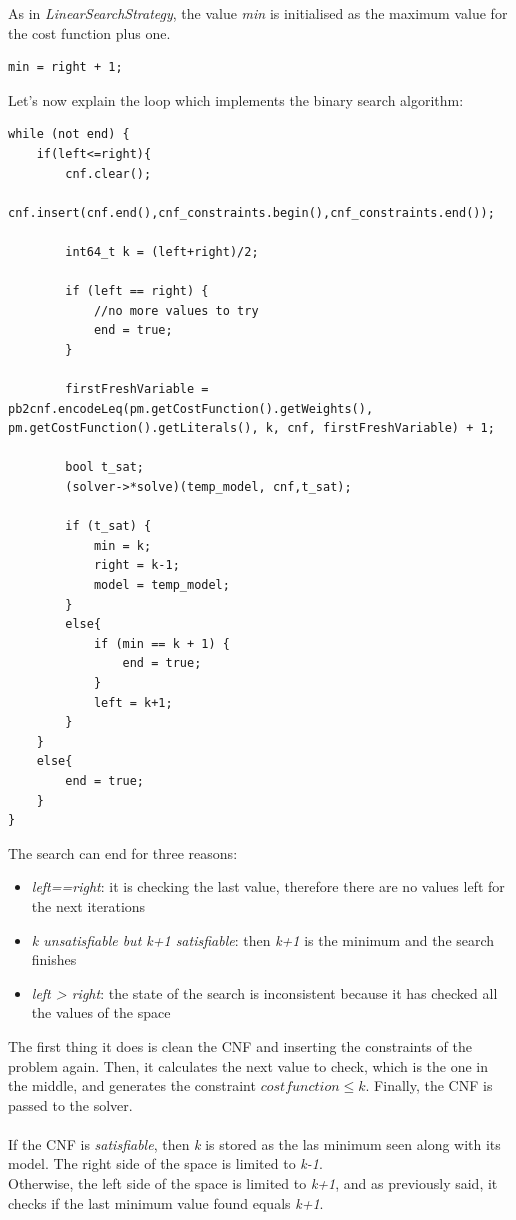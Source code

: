 As in \emph{LinearSearchStrategy}, the value \emph{min} is initialised as the maximum value for the cost function plus one.
\begin{verbatim}
min = right + 1;
\end{verbatim}
Let's now explain the loop which implements the binary search algorithm:
\begin{verbatim}
while (not end) {
    if(left<=right){
        cnf.clear();
        cnf.insert(cnf.end(),cnf_constraints.begin(),cnf_constraints.end());
    
        int64_t k = (left+right)/2;
    
        if (left == right) {
            //no more values to try
            end = true;
        }
    
        firstFreshVariable = pb2cnf.encodeLeq(pm.getCostFunction().getWeights(), pm.getCostFunction().getLiterals(), k, cnf, firstFreshVariable) + 1;
    
        bool t_sat;
        (solver->*solve)(temp_model, cnf,t_sat);
    
        if (t_sat) {
            min = k;
            right = k-1;
            model = temp_model;
        }
        else{
            if (min == k + 1) {
                end = true;
            }
            left = k+1;
        }
    }
    else{
        end = true;
    }
}
\end{verbatim}
The search can end for three reasons:
\begin{itemize}
	\item \emph{left==right}: it is checking the last value, therefore there are no values left for the next iterations
	\item \emph{k unsatisfiable but k+1 satisfiable}: then \emph{k+1} is the minimum and the search finishes
	\item \emph{left > right}: the state of the search is inconsistent because it has checked all the values of the space
\end{itemize}
The first thing it does is clean the CNF and inserting the constraints of the problem again. Then, it calculates the next value to check, which is the one in the middle, and generates the constraint $cost function \leq k$. Finally, the CNF is passed to the solver.\\\\
If the CNF is \emph{satisfiable}, then \emph{k} is stored as the las minimum seen along with its model. The right side of the space is limited to \emph{k-1}.\\
Otherwise, the left side of the space is limited to \emph{k+1}, and as previously said, it checks if the last minimum value found equals \emph{k+1}.